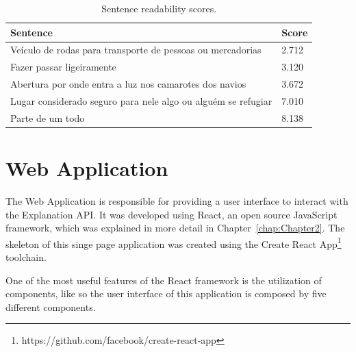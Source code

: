 \begin{table}[H]
    \centering
    \caption{Sentence readability scores.}
    \label{table:sentences}
    \begin{tabular}{l|l}
        {\bfseries Sentence} & {\bfseries Score} \\
        \hline
        Veículo de rodas para transporte de pessoas ou mercadorias & 2.712  \\
        \hline
        Fazer passar ligeiramente & 3.120  \\
        \hline
        Abertura por onde entra a luz nos camarotes dos navios & 3.672 \\
        \hline
        Lugar considerado seguro para nele algo ou alguém se refugiar & 7.010 \\
        \hline
        Parte de um todo & 8.138 \\
    \end{tabular}
\end{table}

\section{Web Application}

The Web Application is responsible for providing a user interface to interact with the Explanation API.
It was developed using React, an open source JavaScript framework, which was explained in more detail in Chapter~\ref{chap:Chapter2}.
The skeleton of this singe page application was created using the Create React App\footnote{https://github.com/facebook/create-react-app} toolchain.

One of the most useful features of the React framework is the utilization of components, like so the user interface of this application is composed by five different components.

